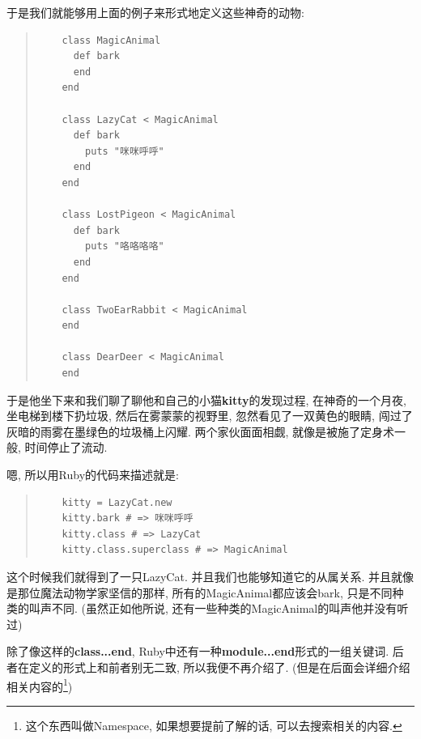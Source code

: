 于是我们就能够用上面的例子来形式地定义这些神奇的动物: 

\begin{quotation}
  \begin{verbatim}
    class MagicAnimal
      def bark
      end
    end

    class LazyCat < MagicAnimal
      def bark
        puts "咪咪呼呼"
      end
    end
    
    class LostPigeon < MagicAnimal
      def bark
        puts "咯咯咯咯"
      end
    end

    class TwoEarRabbit < MagicAnimal
    end
    
    class DearDeer < MagicAnimal
    end
  \end{verbatim}
\end{quotation}

于是他坐下来和我们聊了聊他和自己的小猫\textbf{kitty}的发现过程, 在神奇的一个月夜, 坐电梯到楼下扔垃圾, 然后在雾蒙蒙的视野里, 忽然看见了一双黄色的眼睛, 闯过了灰暗的雨雾在墨绿色的垃圾桶上闪耀. 两个家伙面面相觑, 就像是被施了定身术一般, 时间停止了流动. 

嗯, 所以用Ruby的代码来描述就是: 

\begin{quotation}
  \begin{verbatim}
    kitty = LazyCat.new
    kitty.bark # => 咪咪呼呼
    kitty.class # => LazyCat
    kitty.class.superclass # => MagicAnimal
  \end{verbatim}
\end{quotation}

这个时候我们就得到了一只LazyCat. 并且我们也能够知道它的从属关系. 并且就像是那位魔法动物学家坚信的那样, 所有的MagicAnimal都应该会bark, 只是不同种类的叫声不同. (虽然正如他所说, 还有一些种类的MagicAnimal的叫声他并没有听过)

除了像这样的\textbf{class...end}, Ruby中还有一种\textbf{module...end}形式的一组关键词. 后者在定义的形式上和前者别无二致, 所以我便不再介绍了. (但是在后面会详细介绍相关内容的\footnote{这个东西叫做Namespace, 如果想要提前了解的话, 可以去搜索相关的内容. })

